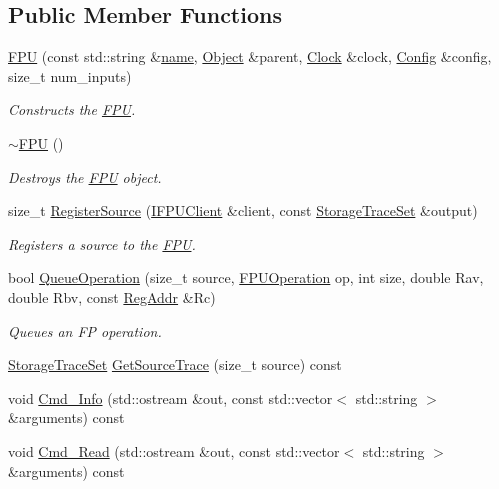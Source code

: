 \subsection*{Public Member Functions}
\begin{DoxyCompactItemize}
\item 
\hyperlink{class_simulator_1_1_f_p_u_ab6a08f9d6a3b169b44da3219684809ce}{F\+P\+U} (const std\+::string \&\hyperlink{mtconf_8c_a8f8f80d37794cde9472343e4487ba3eb}{name}, \hyperlink{class_simulator_1_1_object}{Object} \&parent, \hyperlink{class_simulator_1_1_clock}{Clock} \&clock, \hyperlink{class_config}{Config} \&config, size\+\_\+t num\+\_\+inputs)
\begin{DoxyCompactList}\small\item\em Constructs the \hyperlink{class_simulator_1_1_f_p_u}{F\+P\+U}. \end{DoxyCompactList}\item 
\hyperlink{class_simulator_1_1_f_p_u_a5adfb06a7e937780eb2e8e7c0a6ea5d4}{$\sim$\+F\+P\+U} ()
\begin{DoxyCompactList}\small\item\em Destroys the \hyperlink{class_simulator_1_1_f_p_u}{F\+P\+U} object. \end{DoxyCompactList}\item 
size\+\_\+t \hyperlink{class_simulator_1_1_f_p_u_a4976a10751299a95bff865fe320cf4a0}{Register\+Source} (\hyperlink{class_simulator_1_1_f_p_u_1_1_i_f_p_u_client}{I\+F\+P\+U\+Client} \&client, const \hyperlink{class_simulator_1_1_storage_trace_set}{Storage\+Trace\+Set} \&output)
\begin{DoxyCompactList}\small\item\em Registers a source to the \hyperlink{class_simulator_1_1_f_p_u}{F\+P\+U}. \end{DoxyCompactList}\item 
bool \hyperlink{class_simulator_1_1_f_p_u_a41ed29022d125ab496b15dfc77f089eb}{Queue\+Operation} (size\+\_\+t source, \hyperlink{namespace_simulator_ad8a1c084ddce210647e4867afc95b6e0}{F\+P\+U\+Operation} op, int size, double Rav, double Rbv, const \hyperlink{struct_simulator_1_1_reg_addr}{Reg\+Addr} \&Rc)
\begin{DoxyCompactList}\small\item\em Queues an F\+P operation. \end{DoxyCompactList}\item 
\hyperlink{class_simulator_1_1_storage_trace_set}{Storage\+Trace\+Set} \hyperlink{class_simulator_1_1_f_p_u_a3d652765df9a0b87456df559fd72605a}{Get\+Source\+Trace} (size\+\_\+t source) const 
\item 
void \hyperlink{class_simulator_1_1_f_p_u_a7a0dbba9ebb8ba40afdfa667d7bf7f2e}{Cmd\+\_\+\+Info} (std\+::ostream \&out, const std\+::vector$<$ std\+::string $>$ \&arguments) const 
\item 
void \hyperlink{class_simulator_1_1_f_p_u_a838921d4b26611263f7d165b9d3fb68b}{Cmd\+\_\+\+Read} (std\+::ostream \&out, const std\+::vector$<$ std\+::string $>$ \&arguments) const 
\end{DoxyCompactItemize}
